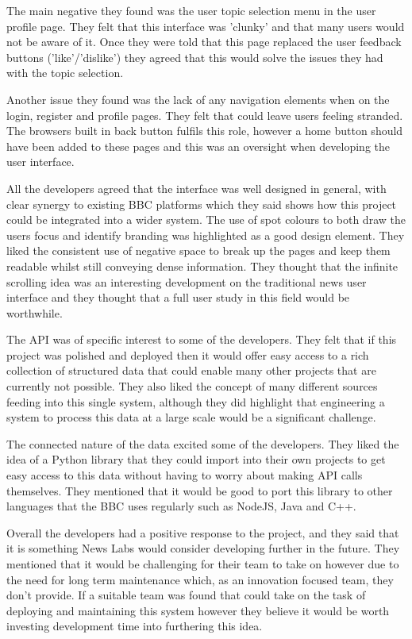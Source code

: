 \documentclass[12pt,titlepage]{article}
\begin{document}
  The main negative they found was the user topic selection menu in the user
  profile page. They felt that this interface was 'clunky' and that many users
  would not be aware of it. Once they were told that this page replaced the user
  feedback buttons ('like'/'dislike') they agreed that this would solve the
  issues they had with the topic selection.

  Another issue they found was the lack of any navigation elements when on the
  login, register and profile pages. They felt that could leave users feeling
  stranded. The browsers built in back button fulfils this role, however a home
  button should have been added to these pages and this was an oversight when
  developing the user interface.

  All the developers agreed that the interface was well designed in general,
  with clear synergy to existing BBC platforms which they said shows how this
  project could be integrated into a wider system. The use of spot colours to
  both draw the users focus and identify branding was highlighted as a good
  design element. They liked the consistent use of negative space to break up
  the pages and keep them readable whilst still conveying dense information.
  They thought that the infinite scrolling idea was an interesting development
  on the traditional news user interface and they thought that a full user study
  in this field would be worthwhile.

  The API was of specific interest to some of the developers. They felt that if
  this project was polished and deployed then it would offer easy access to a
  rich collection of structured data that could enable many other projects that
  are currently not possible. They also liked the concept of many different
  sources feeding into this single system, although they did highlight that
  engineering a system to process this data at a large scale would be a
  significant challenge.

  The connected nature of the data excited some of the developers. They liked
  the idea of a Python library that they could import into their own projects to
  get easy access to this data without having to worry about making API calls
  themselves. They mentioned that it would be good to port this library to other
  languages that the BBC uses regularly such as NodeJS, Java and C++.

  Overall the developers had a positive response to the project, and they said
  that it is something News Labs would consider developing further in the
  future. They mentioned that it would be challenging for their team to take on
  however due to the need for long term maintenance which, as an innovation
  focused team, they don't provide. If a suitable team was found that could take
  on the task of deploying and maintaining this system however they believe it
  would be worth investing development time into furthering this idea.
\end{document}
